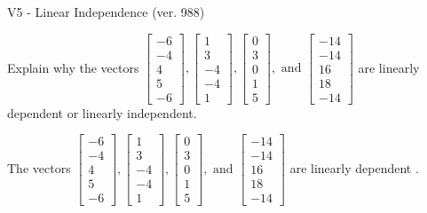 \begin{exercise}
  \begin{exerciseTitle}V5 - Linear Independence (ver. 988)\end{exerciseTitle}
  \begin{exerciseStatement}
    Explain why the vectors \(\left[\begin{array}{r}
-6 \\
-4 \\
4 \\
5 \\
-6
\end{array}\right] , \left[\begin{array}{r}
1 \\
3 \\
-4 \\
-4 \\
1
\end{array}\right] , \left[\begin{array}{r}
0 \\
3 \\
0 \\
1 \\
5
\end{array}\right] , \text{ and } \left[\begin{array}{r}
-14 \\
-14 \\
16 \\
18 \\
-14
\end{array}\right]\) are linearly dependent or linearly independent.	


  \end{exerciseStatement}
  \begin{exerciseAnswer}
   The vectors \(\left[\begin{array}{r}
-6 \\
-4 \\
4 \\
5 \\
-6
\end{array}\right] , \left[\begin{array}{r}
1 \\
3 \\
-4 \\
-4 \\
1
\end{array}\right] , \left[\begin{array}{r}
0 \\
3 \\
0 \\
1 \\
5
\end{array}\right] , \text{ and } \left[\begin{array}{r}
-14 \\
-14 \\
16 \\
18 \\
-14
\end{array}\right]\) are 
  	 linearly dependent  .
  


  \end{exerciseAnswer}
\end{exercise}